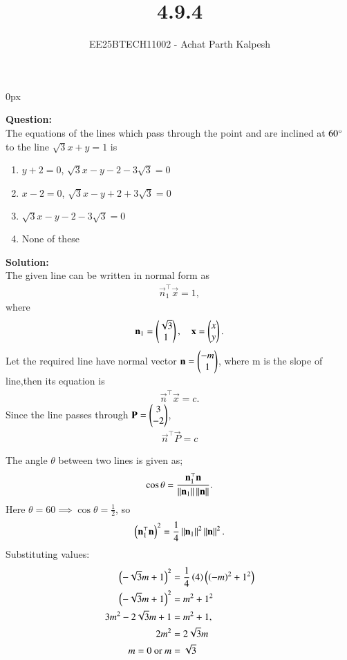 \documentclass[journal]{IEEEtran}
\begin{document}

\title{4.9.4}
\author{EE25BTECH11002 - Achat Parth Kalpesh }
{\let\newpage\relax\maketitle}
\renewcommand{\thefigure}{\theenumi}
\renewcommand{\thetable}{\theenumi}
\setlength{\intextsep}{10pt} %
\renewcommand{\thetable}{\theenumi}
\parindent 0px


\textbf{Question:}\\
 The equations of the lines which pass through the point  and are inclined at $60\degree$ to the line $\sqrt{3} x+y=1$ is
\begin{enumerate}
\item $y+2=0$, $\sqrt{3}x-y-2-3\sqrt{3}=0$
\item $x-2=0$, $\sqrt{3}x-y+2+3\sqrt{3}=0$
\item $\sqrt{3}x-y-2-3\sqrt{3}=0$
\item None of these
\end{enumerate}

\textbf{Solution:}\\
The given line can be written in normal form as
\begin{align}
    \vec{n}_1^\top \vec{x} = 1,
\end{align}
where
\begin{align}
    \mathbf{n}_1 = \begin{pmatrix}\sqrt{3}\\1\end{pmatrix}, \quad \mathbf{x} = \begin{pmatrix}x\\y\end{pmatrix}.
\end{align}
Let the required line have normal vector $\mathbf{n}=\begin{pmatrix}-m\\1\end{pmatrix}$, where m is the slope of line,then its equation is
\begin{align}
    \vec{n}^\top \vec{x} = c.
\end{align}
Since the line passes through $\mathbf{P}=\begin{pmatrix}3\\-2\end{pmatrix}$,
\begin{align}
     \vec{n}^\top \vec{P} = c
\end{align}


The angle $\theta$ between two lines is given as;
\begin{align}
    \cos\theta = \frac{\mathbf{n}_1^\top \mathbf{n}}{\left\lVert\mathbf{n}_1\right\rVert\left\lVert\mathbf{n}\right\rVert}.
\end{align}
Here $\theta = $60\degree$ \implies \cos\theta = \frac{1}{2}$, so
\begin{align}
    \left(\mathbf{n}_1^\top \mathbf{n}\right)^2 = \frac{1}{4}\left\lVert\mathbf{n}_1\right\rVert^2 \left\lVert\mathbf{n}\right\rVert^2.
\end{align}
Substituting values:
\begin{align}
    \left(-\sqrt{3}m + 1\right)^2 &= \frac{1}{4}\left(4\right)\left(\left(-m\right)^2+1^2\right)\\
    \left(-\sqrt{3}m + 1\right)^2 &= m^2 + 1^2\\
    3m^2 - 2\sqrt{3}m + 1 &= m^2 + 1, \\
    2m^2 &= 2\sqrt{3}m  \\
    m = 0 \text{ or } m &= \sqrt{3}
\end{align}
\end{document}
